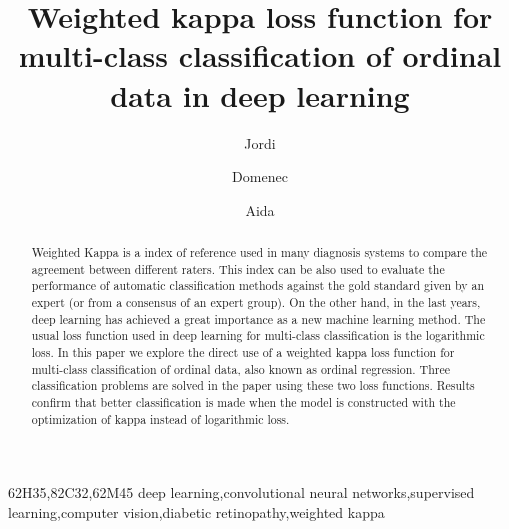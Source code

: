 \documentclass[times,twocolumn,final,authoryear]{elsarticle}
\begin{document}
\thispagestyle{empty}
                                                             
\clearpage


\ifpreprint
  \setcounter{page}{1}
\else
  \setcounter{page}{1}
\fi

\begin{frontmatter}

\title{Weighted kappa loss function for multi-class classification of ordinal data in deep learning}

\author[1]{Jordi } 
\author[1]{Domenec }
\author[1]{Aida }


\address[1]{Departament d'Enginyeria Inform\`{a}tica i Matem\`{a}tiques\\ Universitat Rovira i Virgili \\ Avinguda Pa\"{i}sos Catalans, 26 \\ ES-43007 Tarragona}



\begin{abstract}

Weighted Kappa is a index of reference used in many diagnosis systems to compare the agreement between different raters. This index can be also used to evaluate the performance of automatic classification methods against the gold standard given by an expert (or from a consensus of an expert group). On the other hand, in the last years, deep learning has achieved a great importance as a new machine learning method. The usual loss function used in deep learning for multi-class classification is the logarithmic loss. In this paper we explore the direct use of a weighted kappa loss function for multi-class classification of ordinal data, also known as ordinal regression. Three classification problems are solved in the paper using these two loss functions. Results confirm that better classification is made when the model is constructed with the optimization of kappa instead of logarithmic loss.

\end{abstract}

\begin{keyword}
\MSC 62H35\sep 82C32\sep 62M45
\KWD deep learning\sep convolutional neural networks\sep supervised learning\sep computer vision\sep diabetic retinopathy\sep weighted kappa

\end{keyword}

\end{frontmatter}
\end{document}
